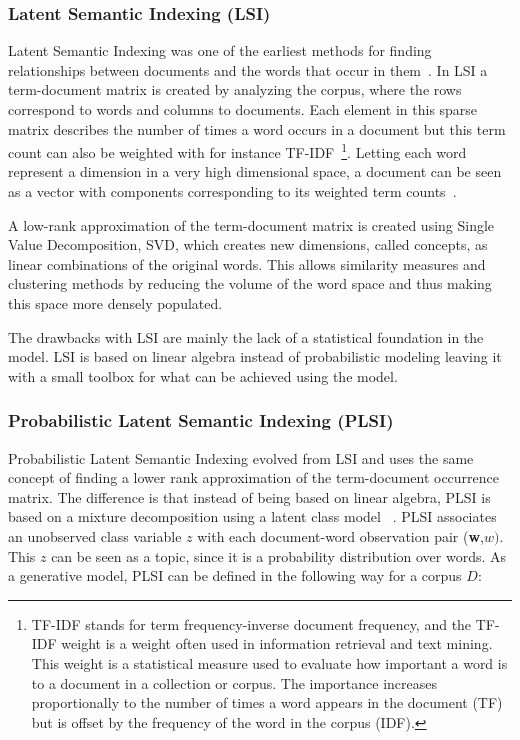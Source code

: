 \documentclass[12pt]{report}
\begin{document}
\subsubsection{Latent Semantic Indexing (LSI)}

Latent Semantic Indexing was one of the earliest methods for finding
relationships between documents and the words that occur in
them~\cite{Deerwester90indexingby}. In LSI a term-document matrix is
created by analyzing the corpus, where the rows correspond to words
and columns to documents. Each element in this sparse matrix describes
the number of times a word occurs in a document but this term count
can also be weighted with for instance TF-IDF~\footnote{TF-IDF stands 
for term frequency-inverse document frequency, and the TF-IDF weight is 
a weight often used in information retrieval and text mining. This weight 
is a statistical measure used to evaluate how important a word is to 
a document in a collection or corpus. The importance increases
proportionally to the number of times a word appears in the document (TF) but
is offset by the frequency of the word in the corpus (IDF).}. Letting
each word represent a dimension in a very high dimensional space, a
document can be seen as a vector with components corresponding to its
weighted term counts~\cite{Salton:1988:TAA:54259.54260}.

A low-rank approximation of the term-document matrix is created using Single
Value Decomposition, SVD, which creates new dimensions, called concepts, as
linear combinations of the original words. This allows similarity measures and
clustering methods by reducing the volume of the word space and thus making
this space more densely populated.

The drawbacks with LSI are mainly the lack of a statistical foundation in the
model. LSI is based on linear algebra instead of probabilistic modeling leaving
it with a small toolbox for what can be achieved using the model.

\subsubsection{Probabilistic Latent Semantic Indexing (PLSI)}

Probabilistic Latent Semantic Indexing evolved from LSI and uses the same
concept of finding a lower rank approximation of the term-document occurrence
matrix. The difference is that instead of being based on linear algebra, PLSI
is based on a mixture decomposition using a latent class model
~\cite{Hofmann:1999:PLS:312624.312649}. PLSI associates an unobserved class 
variable $z$ with each document-word observation pair (\textbf{w},$
w)$. This $z$ can be seen as a topic, since it is a probability distribution
over words. As a generative model, PLSI can be defined in the following way 
for a corpus $D$:
\end{document}
